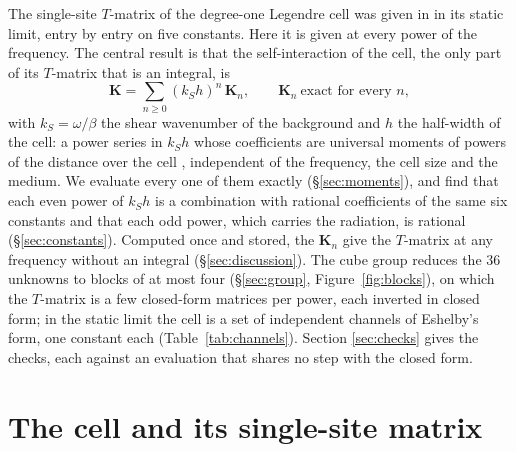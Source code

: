 \documentclass[11pt,a4paper]{article}
\newcommand{\bK}{\mathbf{K}}
\begin{document}
The single-site $T$-matrix of the degree-one Legendre cell was given in \citet{NestorCoupling2026} in its
static limit, entry by entry on five constants. Here it is given at every power of the frequency. The
central result is that the self-interaction of the cell, the only part of its $T$-matrix that is an
integral, is
\begin{equation}\label{eq:centralresult}
  \bK=\sum_{n\ge0}(k_Sh)^n\,\bK_n ,\qquad \bK_n\ \text{exact for every }n,
\end{equation}
with $k_S=\omega/\beta$ the shear wavenumber of the background and $h$ the half-width of the cell:
a power series in $k_Sh$ whose coefficients are universal moments of powers of the distance over the cell
\citep{NestorCoupling2026}, independent of the frequency, the cell size and the medium. We evaluate every one
of them exactly (\S\ref{sec:moments}), and find that each even power of $k_Sh$ is a combination with
rational coefficients of the same six constants and that each odd power, which carries the radiation, is
rational (\S\ref{sec:constants}). Computed once and stored, the $\bK_n$ give the $T$-matrix at any frequency
without an integral (\S\ref{sec:discussion}). The cube group reduces the $36$ unknowns to blocks of at most four
(\S\ref{sec:group}, Figure~\ref{fig:blocks}), on which the $T$-matrix is a few closed-form matrices per
power, each inverted in closed form; in the static limit the cell is a set of independent channels of
Eshelby's form, one constant each (Table~\ref{tab:channels}). Section
\ref{sec:checks} gives the checks, each against an evaluation that shares no step with the closed form.

\section{The cell and its single-site matrix}\label{sec:cell}
\end{document}
